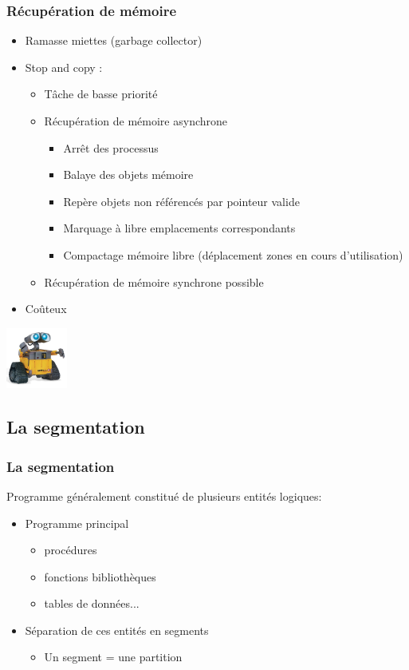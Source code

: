 \begin{frame}
\frametitle{Récupération de mémoire}
\begin{itemize}
\item Ramasse miettes (garbage collector)
\item Stop and copy :
\begin{itemize}
\item Tâche de basse priorité
\item Récupération de mémoire asynchrone
\begin{itemize}
\item Arrêt des processus
\item Balaye des objets mémoire
\item Repère objets non référencés par pointeur valide
\item Marquage à libre emplacements correspondants
\item Compactage mémoire libre (déplacement zones en cours d’utilisation)
\end{itemize}
\item Récupération de mémoire synchrone possible
\end{itemize}
\item Coûteux
\end{itemize}
\includegraphics[width=2cm]{../illustration/wall-e.jpg}
\end{frame}

\subsection{La segmentation}
\begin{frame}
\frametitle{La segmentation}
Programme généralement constitué de plusieurs entités logiques:
\begin{itemize}
\item Programme principal
\begin{itemize}
\item procédures
\item fonctions bibliothèques
\item tables de données...
\end{itemize}
\item Séparation de ces entités en segments
\begin{itemize}
\item Un segment = une partition
\end{itemize}
\end{itemize}
\end{frame}


